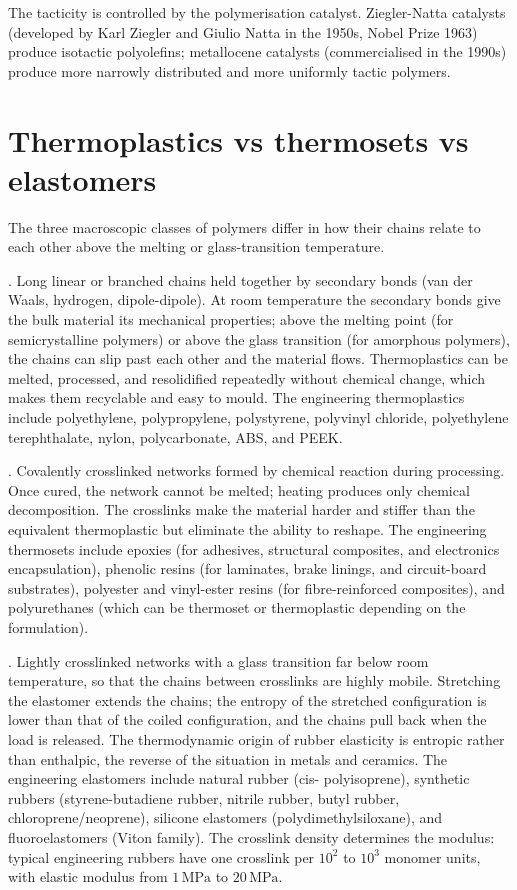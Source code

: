 The tacticity is controlled by the polymerisation catalyst.
Ziegler-Natta catalysts (developed by Karl Ziegler and Giulio Natta
in the 1950s, Nobel Prize 1963) produce isotactic polyolefins;
metallocene catalysts (commercialised in the 1990s) produce more
narrowly distributed and more uniformly tactic polymers.

\section{Thermoplastics vs thermosets vs elastomers}

The three macroscopic classes of polymers differ in how their chains
relate to each other above the melting or glass-transition temperature.

. Long linear or branched chains held together
by secondary bonds (van der Waals, hydrogen, dipole-dipole). At room
temperature the secondary bonds give the bulk material its mechanical
properties; above the melting point (for semicrystalline polymers) or
above the glass transition (for amorphous polymers), the chains can
slip past each other and the material flows. Thermoplastics can be
melted, processed, and resolidified repeatedly without chemical
change, which makes them recyclable and easy to mould. The
engineering thermoplastics include polyethylene, polypropylene,
polystyrene, polyvinyl chloride, polyethylene terephthalate, nylon,
polycarbonate, ABS, and PEEK.

. Covalently crosslinked networks formed by
chemical reaction during processing. Once cured, the network cannot
be melted; heating produces only chemical decomposition. The
crosslinks make the material harder and stiffer than the equivalent
thermoplastic but eliminate the ability to reshape. The engineering
thermosets include epoxies (for adhesives, structural composites, and
electronics encapsulation), phenolic resins (for laminates, brake
linings, and circuit-board substrates), polyester and vinyl-ester
resins (for fibre-reinforced composites), and polyurethanes (which
can be thermoset or thermoplastic depending on the formulation).

. Lightly crosslinked networks with a glass
transition far below room temperature, so that the chains between
crosslinks are highly mobile. Stretching the elastomer extends the
chains; the entropy of the stretched configuration is lower than that
of the coiled configuration, and the chains pull back when the load
is released. The thermodynamic origin of rubber elasticity is entropic
rather than enthalpic, the reverse of the situation in metals and
ceramics. The engineering elastomers include natural rubber (cis-
polyisoprene), synthetic rubbers (styrene-butadiene rubber, nitrile
rubber, butyl rubber, chloroprene/neoprene), silicone elastomers
(polydimethylsiloxane), and fluoroelastomers (Viton family). The
crosslink density determines the modulus: typical engineering rubbers
have one crosslink per $10^2$ to $10^3$ monomer units, with elastic
modulus from $1\,\text{MPa}$ to $20\,\text{MPa}$.

